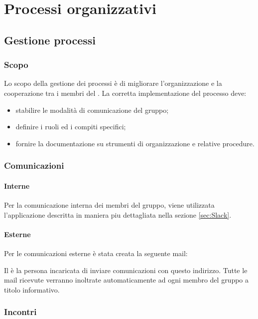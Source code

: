 \section{Processi organizzativi}
    \subsection{Gestione processi}
		\subsubsection{Scopo}
		Lo scopo della gestione dei processi è di migliorare l'organizzazione e la cooperazione tra i membri del . La corretta implementazione del processo deve:
		\begin{itemize}
			\item stabilire le modalità di comunicazione del gruppo;
			\item definire i ruoli ed i compiti specifici;
			\item fornire la documentazione su strumenti di organizzazione e relative procedure.
		\end{itemize}

        \subsubsection{Comunicazioni}

            \paragraph{Interne}
                Per la comunicazione interna dei membri del gruppo, viene utilizzata l'applicazione  descritta in maniera piu dettagliata nella sezione \ref{sec:Slack}.

            \paragraph{Esterne}
				Per le comunicazioni esterne è stata creata la seguente mail:
				\begin{center}
					\mailzep{}
				\end{center}
				Il \responsabilediprogetto{} è la persona incaricata di inviare comunicazioni con questo indirizzo. Tutte le mail ricevute verranno inoltrate automaticamente ad ogni membro del gruppo a titolo informativo.
        \subsubsection{Incontri}
